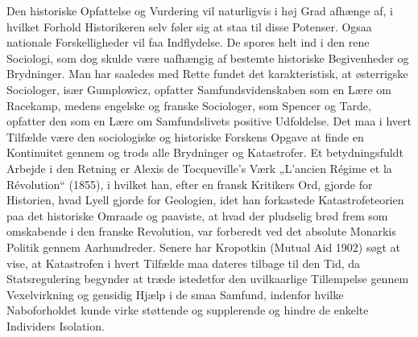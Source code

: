 \documentclass[12pt,a4paper,openany]{book}
\begin{document}
Den historiske Opfattelse og Vurdering vil naturligvis i høj Grad
afhænge af, i hvilket Forhold Historikeren selv føler sig at staa til
disse Potenser. Ogsaa nationale Forskelligheder vil faa Indflydelse.
De spores helt ind i den rene Sociologi, som dog skulde være uafhængig
af bestemte historiske Begivenheder og Brydninger. Man har
saaledes med Rette fundet det karakteristisk, at østerrigske Sociologer,
især Gumplowicz, opfatter Samfundsvidenskaben som en Lære
om Racekamp, medens engelske og franske Sociologer, som Spencer
og Tarde, opfatter den som en Lære om Samfundslivets positive
Udfoldelse. Det maa i hvert Tilfælde være den sociologiske og historiske
Forskens Opgave at finde en Kontinuitet gennem og trods alle
Brydninger og Katastrofer. Et betydningsfuldt Arbejde i den Retning
er Alexis de Tocqueville’s Værk „L’ancien Régime et la Révolution“
(1855), i hvilket han, efter en fransk Kritikers Ord, gjorde for Historien,
hvad Lyell gjorde for Geologien, idet han forkastede Katastrofeteorien
paa det historiske Omraade og paaviste, at hvad der pludselig
brød frem som omskabende i den franske Revolution, var forberedt
ved det absolute Monarkis Politik gennem Aarhundreder.
Senere har Kropotkin (Mutual Aid 1902) søgt at vise, at Katastrofen
i hvert Tilfælde maa dateres tilbage til den Tid, da Statsregulering
begynder at træde istedetfor den uvilkaarlige Tillempelse gennem
Vexelvirkning og gensidig Hjælp i de smaa Samfund, indenfor hvilke
Naboforholdet kunde virke støttende og supplerende og hindre de
enkelte Individers Isolation.
\end{document}
